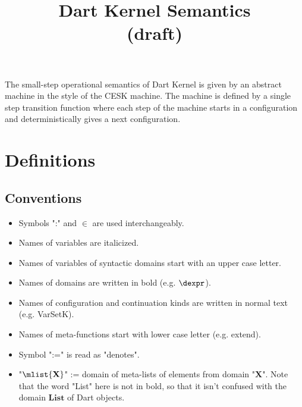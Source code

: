 \documentclass{article}
\begin{document}
\title{Dart Kernel Semantics \\ (draft)}

\maketitle

The small-step operational semantics of Dart Kernel is given by an abstract machine in the style of the CESK machine. The machine is defined by a single step transition function where each step of the machine starts in a configuration and deterministically gives a next configuration.

\section{Definitions}
\subsection{Conventions}
\begin{itemize}
\setlength{\itemsep}{0pt}
\item Symbols ":" and $\in$ are used interchangeably.
\item Names of variables are italicized.
\item Names of variables of syntactic domains start with an upper case letter.
\item Names of domains are written in bold (e.g. $\dexpr$).
\item Names of configuration and continuation kinds are written in normal text (e.g. VarSetK).
\item Names of meta-functions start with lower case letter (e.g. extend).
\item Symbol ":=" is read as "denotes".
\item "$\mlist{\mathbf{X}}$" := domain of meta-lists of elements from domain "$\mathbf{X}$". Note that the word "List" here is not in bold, so that it isn't confused with the domain $\mathbf{List}$ of Dart objects.
\end{itemize}
\end{document}
